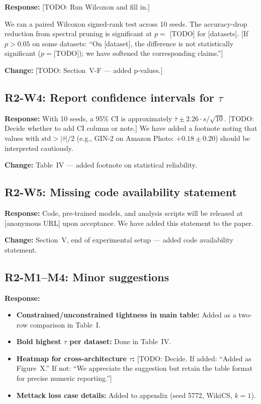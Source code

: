 \documentclass[11pt]{article}
\newcommand{\reviewer}[1]{\subsection*{\textcolor{revcolor}{#1}}}
\newcommand{\response}[1]{\textcolor{responsecolor}{\textbf{Response:} #1}}
\newcommand{\change}[1]{\textcolor{changecolor}{\textbf{Change:} #1}}
\begin{document}
\response{
[TODO: Run Wilcoxon and fill in.]

We ran a paired Wilcoxon signed-rank test across 10 seeds. The accuracy-drop reduction from spectral pruning is significant at $p = $ [TODO] for [datasets]. [If $p > 0.05$ on some datasets: ``On [dataset], the difference is not statistically significant ($p = $[TODO]); we have softened the corresponding claims.'']
}

\change{[TODO: Section~V-F --- added p-values.]}


\reviewer{R2-W4: Report confidence intervals for $\tau$}

\response{
With 10 seeds, a 95\% CI is approximately $\bar{\tau} \pm 2.26 \cdot s / \sqrt{10}$. [TODO: Decide whether to add CI column or note.] We have added a footnote noting that values with $\mathrm{std} > |\bar{\tau}|/2$ (e.g., GIN-2 on Amazon Photo: $+0.18 \pm 0.20$) should be interpreted cautiously.
}

\change{Table~IV --- added footnote on statistical reliability.}


\reviewer{R2-W5: Missing code availability statement}

\response{Code, pre-trained models, and analysis scripts will be released at [anonymous URL] upon acceptance. We have added this statement to the paper.}

\change{Section~V, end of experimental setup --- added code availability statement.}


\reviewer{R2-M1--M4: Minor suggestions}

\response{
\begin{itemize}
\item \textbf{Constrained/unconstrained tightness in main table:} Added as a two-row comparison in Table~I.
\item \textbf{Bold highest $\tau$ per dataset:} Done in Table~IV.
\item \textbf{Heatmap for cross-architecture $\tau$:} [TODO: Decide. If added: ``Added as Figure~X.'' If not: ``We appreciate the suggestion but retain the table format for precise numeric reporting.'']
\item \textbf{Mettack loss case details:} Added to appendix (seed 5772, WikiCS, $k=1$).
\end{itemize}
}
\end{document}
